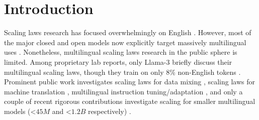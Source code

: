 

\vspace{-2mm}
\section{Introduction}
\vspace{-1mm}

Scaling laws research has focused overwhelmingly on English \citep{kaplan2020scaling, hoffmann2022training, li2025mis}.
However, most of the major closed and open models now explicitly target massively multilingual uses \citep{openai2025gpt5, claude4, deepmind2025gemini25deepthink, deepseekv3, olmo2}.
Nonetheless, multilingual scaling laws research in the public sphere is limited.
Among proprietary lab reports, only Llama-3 briefly discuss their multilingual scaling laws, though they train on only 8\% non-English tokens \citep{dubey2024llama}.
Prominent public work investigates scaling laws for data mixing \citep{goyal2024scaling, ye2024data, ge2024bimix}, scaling laws for machine translation
\citep{fernandes2023scaling, gordon2021data}, multilingual instruction tuning/adaptation \citep{shaham2024multilingual, lai2024llms, weber2024investigating}, and only a couple of recent rigorous contributions investigate scaling for smaller multilingual models (<$45M$ and <$1.2B$ respectively) \citep{chang2024multilinguality, he2024scaling}.

